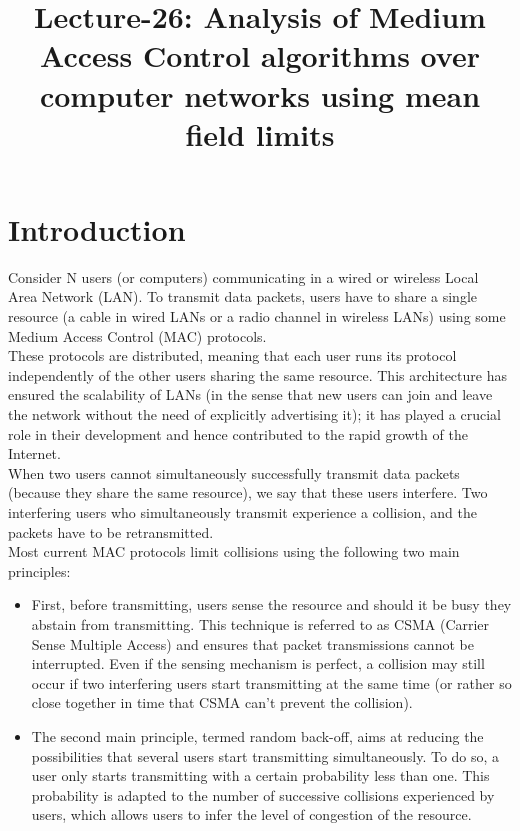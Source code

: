 \documentclass[letterpaper,english,10pt]{article}
\title{Lecture-26: Analysis of Medium Access Control algorithms over computer networks using mean field limits}
\begin{document}
\maketitle
\section{Introduction}

Consider N users (or computers) communicating in a wired or wireless Local Area Network (LAN). To transmit data packets, users have to share a single resource (a cable in wired LANs or a radio channel in wireless LANs) using some Medium Access Control (MAC) protocols. \\

These protocols are distributed, meaning that each user runs its protocol independently of the other users sharing the same resource. This architecture has ensured the scalability of LANs (in the sense that new users can join and leave the network without the need of explicitly advertising it); it has played a crucial role in their development and hence contributed to the rapid growth of the Internet.\\

When two users cannot simultaneously successfully transmit data packets (because they share the same resource), we say that these users interfere. Two interfering users who simultaneously transmit experience a collision, and the packets have to be retransmitted. \\

Most current MAC protocols limit collisions using the following two main principles:

\begin{itemize}

\item First, before transmitting, users sense the resource and should it be busy they abstain from transmitting. This technique is referred to as CSMA (Carrier Sense Multiple Access) and ensures that packet transmissions cannot be interrupted. Even if the sensing mechanism is perfect, a collision may still occur if two interfering users start transmitting at the same time (or rather so close together in time that CSMA can’t prevent the collision). 

\item  The second main principle, termed random back-off, aims at reducing the possibilities that several users start transmitting simultaneously. To do so, a user only starts transmitting with a certain probability less than one. This probability is adapted to the number of successive collisions experienced by users, which allows users to infer the level of congestion of the resource.\\

\end{itemize}
\end{document}
